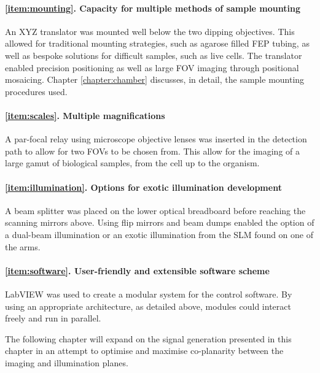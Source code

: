 \paragraph{\ref{item:mounting}. Capacity for multiple methods of sample mounting}
An XYZ translator was mounted well below the two dipping objectives.
This allowed for traditional mounting strategies, such as agarose filled \gls{FEP} tubing, as well as bespoke solutions for difficult samples, such as live cells.
The translator enabled precision positioning as well as large FOV imaging through positional mosaicing.
Chapter \ref{chapter:chamber} discusses, in detail, the sample mounting procedures used.

\paragraph{\ref{item:scales}. Multiple magnifications}
A par-focal relay using microscope objective lenses was inserted in the detection path to allow for two FOVs to be chosen from. This allow for the imaging of a large gamut of biological samples, from the cell up to the organism.

\paragraph{\ref{item:illumination}. Options for exotic illumination development}
A beam splitter was placed on the lower optical breadboard before reaching the scanning mirrors above. Using flip mirrors and beam dumps enabled the option of a dual-beam illumination or an exotic illumination from the SLM found on one of the arms.

\paragraph{\ref{item:software}. User-friendly and extensible software scheme}
\gls{LabVIEW} was used to create a modular system for the control software.
By using an appropriate architecture, as detailed above, modules could interact freely and run in parallel.

The following chapter will expand on the signal generation presented in this chapter in an attempt to optimise and maximise co-planarity between the imaging and illumination planes.


